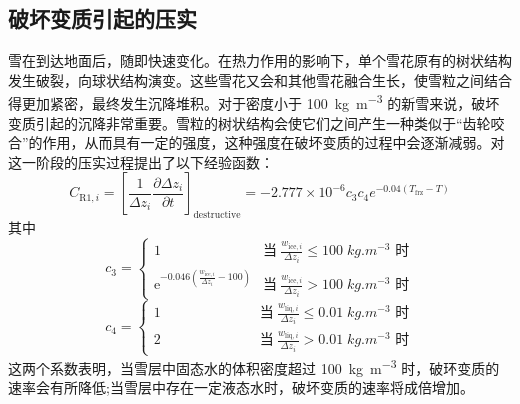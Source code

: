\subsection{破坏变质引起的压实}
雪在到达地面后，随即快速变化。在热力作用的影响下，单个雪花原有的树状结构发生破裂，向球状结构演变。这些雪花又会和其他雪花融合生长，使雪粒之间结合得更加紧密，最终发生沉降堆积。对于密度小于 \qty{100}{kg.m^{-3}} 的新雪来说，破坏变质引起的沉降非常重要。雪粒的树状结构会使它们之间产生一种类似于“齿轮咬合”的作用，从而具有一定的强度，这种强度在破坏变质的过程中会逐渐减弱。\citet{anderson1976point}对这一阶段的压实过程提出了以下经验函数：
\begin{equation}\label{eq:DestruciveCompact}
  C_{\mathrm{R1},i}=\left[\frac{1}{\Delta {z_i}} \frac{\partial \Delta {z_i}}{\partial {t}}\right]_{\text {destructive}}=-2.777 \times 10^{-6} {c}_{3} {c}_{4} {e}^{-0.04\left(T_{\mathrm {frz}} -T\right)}
\end{equation}
其中
\begin{equation}
  c_3=\begin{cases}
    1 &\text{当}\ \frac{w_{\mathrm{ice},i}}{\Delta z_i} \leqslant 100 \;\unit{kg.m^{-3}}\text{ 时} \\
    {\mathrm e}^{-0.046\left(\frac{w_{\mathrm{ice},i}}{\Delta z_i}-100\right)} &\text{当}\ \frac{w_{\mathrm{ice},i}}{\Delta z_i}>100 \;\unit{kg.m^{-3}}\text{ 时}
  \end{cases}
\end{equation}
\begin{equation}
  c_4=\begin{cases}
    1 &\qquad \quad \qquad \quad \;\text{当}\ \frac{w_{\mathrm{liq},i}}{\Delta z_i} \leqslant 0.01 \;\unit{kg.m^{-3}}\text{ 时} \\
    2 &\qquad \quad \qquad \quad \;\text{当}\ \frac{w_{\mathrm{liq},i}}{\Delta z_i}>0.01 \;\unit{kg.m^{-3}}\text{ 时}
  \end{cases}
\end{equation}
这两个系数表明，当雪层中固态水的体积密度超过 \qty{100}{kg.m^{-3}} 时，破环变质的速率会有所降低;当雪层中存在一定液态水时，破坏变质的速率将成倍增加。

